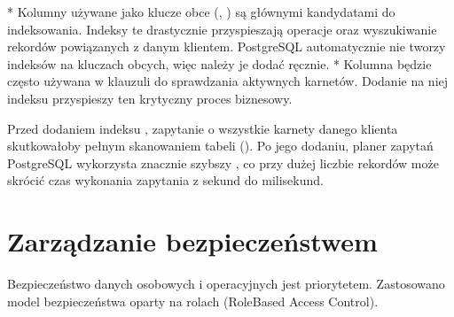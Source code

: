 \documentclass[letterpaper,10pt,polish]{sphinxmanual}
\begin{document}
\sphinxAtStartPar
{}
*  Kolumny używane jako klucze obce (, ) są głównymi kandydatami do indeksowania. Indeksy te drastycznie przyspieszają operacje  oraz wyszukiwanie rekordów powiązanych z danym klientem. PostgreSQL automatycznie nie tworzy indeksów na kluczach obcych, więc należy je dodać ręcznie.
*  Kolumna  będzie często używana w klauzuli  do sprawdzania aktywnych karnetów. Dodanie na niej indeksu przyspieszy ten krytyczny proces biznesowy.

\sphinxAtStartPar
{}

\begin{sphinxVerbatim}[commandchars=\\\{\}]


\end{sphinxVerbatim}

\sphinxAtStartPar
{}
Przed dodaniem indeksu , zapytanie o wszystkie karnety danego klienta skutkowałoby pełnym skanowaniem tabeli (). Po jego dodaniu, planer zapytań PostgreSQL wykorzysta znacznie szybszy , co przy dużej liczbie rekordów może skrócić czas wykonania zapytania z sekund do milisekund.


\section{Zarządzanie bezpieczeństwem}
\label{\detokenize{rozdzial4/rozdzial4:zarzadzanie-bezpieczenstwem}}
\sphinxAtStartPar
Bezpieczeństwo danych osobowych i operacyjnych jest priorytetem. Zastosowano model bezpieczeństwa oparty na rolach (Role\sphinxhyphen{}Based Access Control).
\end{document}
